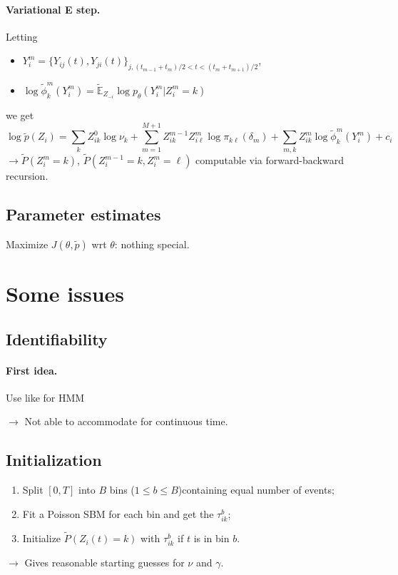 \documentclass[a4paper, 12pt]{article}
\newcommand{\kl}{{k\ell}}
\newcommand{\Esp}{\mathbb{E}}
\newcommand{\Espt}{\widetilde{\Esp}}
\newcommand{\pt}{\widetilde{p}}
\newcommand{\Pt}{\widetilde{P}}
\newcommand{\phit}{\widetilde{\phi}}
\newcommand{\ra}{$\rightarrow$\xspace}
\begin{document}
\paragraph{Variational E step.} Letting 
\begin{itemize}
 \item $Y_i^m = \{Y_{ij}(t), Y_{ji}(t)\}_{j, (t_{m-1}+t_m)/2 < t < (t_m+t_{m+1})/2}$,
 \item $\log \phit_k^m(Y_i^m) = \Espt_{Z_{-i}} \log p_\theta(Y_i^m | Z_i^m = k)$
\end{itemize}
we get
$$
\log \pt(Z_i)
= \sum_k Z_{ik}^0 \log \nu_k 
+ \sum_{m=1}^{M+1} Z_{ik}^{m-1} Z_{i\ell}^m \log \pi_\kl(\delta_m)
+ \sum_{m, k} Z_{ik}^m \log \phit_k^m(Y_i^m)
+ c_i
$$
\ra $\Pt(Z_i^m=k)$, $\Pt(Z_i^{m-1}=k, Z_i^m=\ell)$ computable via forward-backward recursion.

\subsection{Parameter estimates}

Maximize $J(\theta, \pt)$ wrt $\theta$: nothing special.

\newpage
\section{Some issues}

\subsection{Identifiability}

\paragraph{First idea.} Use \cite{AMR09} like for HMM

\ra Not able to accommodate for continuous time.

\subsection{Initialization}

\begin{enumerate}
 \item Split $[0, T]$ into $B$ bins ($1 \leq b \leq B$)containing equal number of events;
 \item Fit a Poisson SBM for each bin and get the $\tau_{ik}^b$;
 \item Initialize $\Pt(Z_i(t) = k)$ with $\tau_{ik}^b$ if $t$ is in bin $b$.
\end{enumerate}
\ra Gives reasonable starting guesses for $\nu$ and $\gamma$.
\end{document}
